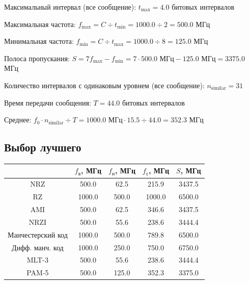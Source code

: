 Максимальный интервал (все сообщение): $t_\mathrm{max}=4.0$ битовых интервалов

Максимальная частота: $f_\mathrm{max}=C\div t_\mathrm{min}=1000.0\div 2=500.0$ МГц

Минимальная частота: $f_\mathrm{min}=C\div t_\mathrm{max}=1000.0\div 8=125.0$ МГц

Полоса пропускания: $S=7f_\mathrm{max}-f_\mathrm{min} = 7\cdot 500.0\text{ МГц}-125.0\text{ МГц}=3375.0$ МГц

Количество интервалов с одинаковым уровнем (все сообщение): $n_\mathrm{similar}=31$

Время передачи сообщения: $T=44.0$ битовых интервалов

Среднее: $f_0\cdot n_\mathrm{similar}\div T=1000.0\text{ МГц}\cdot 15.5\div 44.0=352.3$ МГц

\subsection{Выбор лучшего}
\begin{center}
    \begin{tabular}{c|cccc}
        & $f_\mathrm{\text{в}}$, МГц
        & $f_\mathrm{\text{н}}$, МГц
        & $f_\mathrm{\text{с}}$, МГц
        & $S$, МГц \\ \hline
        NRZ               &  500.0 &  62.5 &  215.9 & 3437.5 \\
        RZ                & 1000.0 & 500.0 & 1000.0 & 6500.0 \\
        AMI               &  500.0 &  62.5 &  346.6 & 3437.5 \\
        NRZI              &  500.0 &  55.6 &  238.6 & 3444.4 \\
        Манчестерский код & 1000.0 & 500.0 &  789.8 & 6500.0 \\
        Дифф. манч. код   & 1000.0 & 250.0 &  750.0 & 6750.0 \\
        MLT-3             &  500.0 &  55.6 &  238.6 & 3444.4 \\
        PAM-5             &  500.0 & 125.0 &  352.3 & 3375.0 \\
    \end{tabular}
\end{center}

